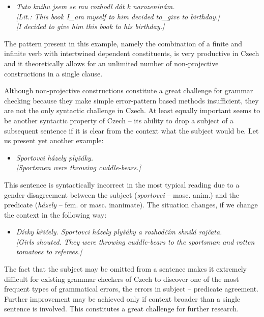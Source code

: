 \begin{multicols}{2}
\begin{itemize}
\item[]\textit{Tuto knihu jsem se mu rozhodl dát k narozeninám.\\
{[}Lit.: This book I\_am myself to him decided to\_give to birthday.{]}\\
{[}I decided to give him this book to his birthday.{]}}
\end{itemize}

The pattern present in this example, namely the combination of a finite and infinite verb with intertwined dependent constituents, is very productive in Czech and it theoretically allows for an unlimited number of non-projective constructions in a single clause.

Although non-projective constructions constitute a great challenge for grammar checking because they make simple error-pattern based methods insufficient, they are not the only syntactic challenge in Czech. At least equally important seems to be another syntactic property of Czech – its ability to drop a subject of a subsequent sentence if it is clear from the context what the subject would be. Let us present yet another example:

\begin{itemize}
\item[]\textit{Sportovci házely plyšáky.\\
{[}Sportsmen were throwing cuddle-bears.{]}}
\end{itemize}

This sentence is syntactically incorrect in the most typical reading due to a gender disagreement between the subject (\textit{sportovci} – masc. anim.) and the predicate (\textit{házely} – fem. or masc. inanimate). The situation changes, if we change the context in the following way:

\begin{itemize}
\item[]\textit{Dívky křičely. Sportovci házely plyšáky a rozhodčím shnilá rajčata.\\
{[}Girls shouted. They were throwing cuddle-bears to the sportsman and rotten tomatoes to referees.{]}}
\end{itemize}

The fact that the subject may be omitted from a sentence makes it extremely difficult for existing grammar checkers of Czech to discover one of the most frequent types of grammatical errors, the errors in subject – predicate agreement. Further improvement may be achieved only if context broader than a single sentence is involved. This constitutes a great challenge for further research.


\end{multicols}
